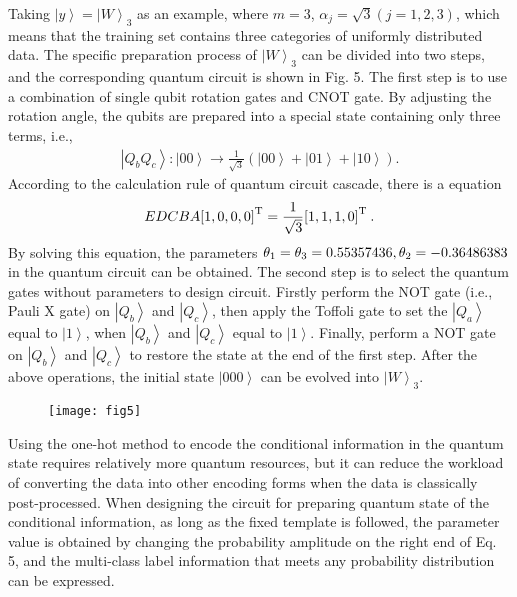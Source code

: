 \documentclass{bmcart}
\begin{document}
Taking $\left| y \right\rangle  = {\left| W \right\rangle _3}$ as an example, where $m=3$, ${\alpha _j} = \sqrt 3 \left( {j = 1,2,3} \right)$, which means that the training set contains three categories of uniformly distributed data. The specific preparation process of ${\left| W \right\rangle _3}$ can be divided into two steps, and the corresponding quantum circuit is shown in Fig. 5. The first step is to use a combination of single qubit rotation gates and CNOT gate. By adjusting the rotation angle, the qubits are prepared into a special state containing only three terms, i.e.,
%
\begin{eqnarray}\label{eqexpmuts}
\left| {{Q_b}{Q_c}} \right\rangle :\left| {00} \right\rangle  \to \frac{1}{{\sqrt 3 }}\left( {\left| {00} \right\rangle  + \left| {01} \right\rangle  + \left| {10} \right\rangle } \right).
\end{eqnarray}
%
According to the calculation rule of quantum circuit cascade, there is a equation
%
\begin{eqnarray}\label{eqexpmuts}
EDCBA{\left[ {1,0,0,0} \right]^{\rm T}} = \frac{1}{{\sqrt 3 }}{\left[ {1,1,1,0} \right]^{{\rm T}\;}}.
\end{eqnarray}
%
By solving this equation, the parameters ${\theta _1} = {\theta _3} = {\rm{0}}{\rm{.55357436}}, {\theta _2} = {\rm{ - 0}}{\rm{.36486383}}$ in the quantum circuit can be obtained. The second step is to select the quantum gates without parameters to design circuit. Firstly perform the NOT gate (i.e., Pauli X gate) on $\left| {{Q_b}} \right\rangle $ and $\left| {{Q_c}} \right\rangle $, then apply the Toffoli gate to set the $\left| {{Q_a}} \right\rangle $ equal to $\left| 1 \right\rangle $, when $\left| {{Q_b}} \right\rangle $ and $\left| {{Q_c}} \right\rangle $ equal to $\left| 1 \right\rangle $. Finally, perform a NOT gate on $\left| {{Q_b}} \right\rangle $ and $\left| {{Q_c}} \right\rangle $ to restore the state at the end of the first step. After the above operations, the initial state $\left| {000} \right\rangle $ can be evolved into ${\left| W \right\rangle _3}$.

  \begin{figure}[h!]
  \texttt{[image: fig5]}
  \caption{}
      \end{figure}


Using the one-hot method to encode the conditional information in the quantum state requires relatively more quantum resources, but it can reduce the workload of converting the data into other encoding forms when the data is classically post-processed. When designing the circuit for preparing quantum state of the conditional information, as long as the fixed template is followed, the parameter value is obtained by changing the probability amplitude on the right end of Eq. 5, and the multi-class label information that meets any probability distribution can be expressed.
\end{document}
